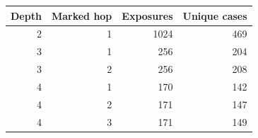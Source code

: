 \begin{tabular}{rrrr}
\toprule
Depth & Marked hop & Exposures & Unique cases \\
\midrule
2 & 1 & 1024 & 469 \\
3 & 1 & 256 & 204 \\
3 & 2 & 256 & 208 \\
4 & 1 & 170 & 142 \\
4 & 2 & 171 & 147 \\
4 & 3 & 171 & 149 \\
\bottomrule
\end{tabular}
